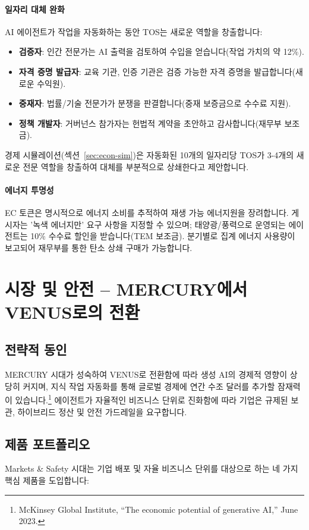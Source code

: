 \documentclass[11pt]{article}
\begin{document}
\paragraph{일자리 대체 완화} AI 에이전트가 작업을 자동화하는 동안 TOS는 새로운 역할을 창출합니다:
\begin{itemize}[noitemsep]
  \item \textbf{검증자}: 인간 전문가는 AI 출력을 검토하여 수입을 얻습니다(작업 가치의 약 12\%).
  \item \textbf{자격 증명 발급자}: 교육 기관, 인증 기관은 검증 가능한 자격 증명을 발급합니다(새로운 수익원).
  \item \textbf{중재자}: 법률/기술 전문가가 분쟁을 판결합니다(중재 보증금으로 수수료 지원).
  \item \textbf{정책 개발자}: 거버넌스 참가자는 헌법적 계약을 초안하고 감사합니다(재무부 보조금).
\end{itemize}
경제 시뮬레이션(섹션~\ref{sec:econ-sim})은 자동화된 10개의 일자리당 TOS가 3-4개의 새로운 전문 역할을 창출하여 대체를 부분적으로 상쇄한다고 제안합니다.

\paragraph{에너지 투명성} EC 토큰은 명시적으로 에너지 소비를 추적하여 재생 가능 에너지원을 장려합니다. 게시자는 '녹색 에너지만' 요구 사항을 지정할 수 있으며; 태양광/풍력으로 운영되는 에이전트는 10\% 수수료 할인을 받습니다(TEM 보조금). 분기별로 집계 에너지 사용량이 보고되어 재무부를 통한 탄소 상쇄 구매가 가능합니다.

\section{시장 및 안전 -- MERCURY에서 VENUS로의 전환}
\subsection{전략적 동인}
MERCURY 시대가 성숙하여 VENUS로 전환함에 따라 생성 AI의 경제적 영향이 상당히 커지며, 지식 작업 자동화를 통해 글로벌 경제에 연간 수조 달러를 추가할 잠재력이 있습니다.\footnote{McKinsey Global Institute, ``The economic potential of generative AI,'' June 2023.} 에이전트가 자율적인 비즈니스 단위로 진화함에 따라 기업은 규제된 보관, 하이브리드 정산 및 안전 가드레일을 요구합니다.

\subsection{제품 포트폴리오}
Markets \& Safety 시대는 기업 배포 및 자율 비즈니스 단위를 대상으로 하는 네 가지 핵심 제품을 도입합니다:
\end{document}
